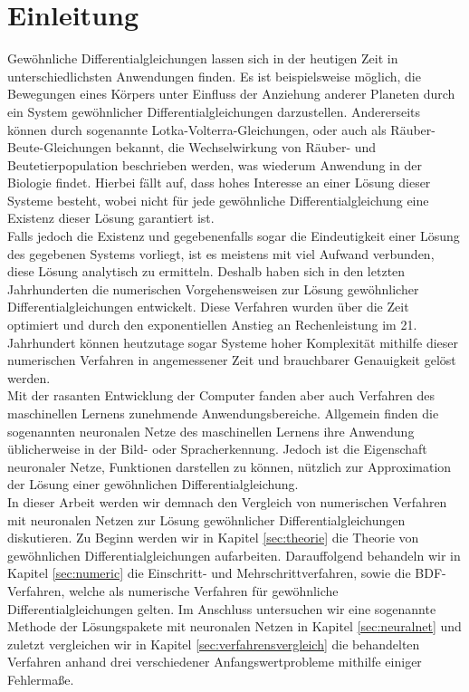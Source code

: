 \section{Einleitung}
\label{sec:einleitung}
Gewöhnliche Differentialgleichungen lassen sich in der heutigen Zeit in unterschiedlichsten Anwendungen finden.
Es ist beispielsweise möglich, die Bewegungen eines Körpers unter Einfluss der Anziehung anderer Planeten durch
ein System gewöhnlicher Differentialgleichungen darzustellen. Andererseits können durch sogenannte
Lotka-Volterra-Gleichungen, oder auch als Räuber-Beute-Gleichungen bekannt, die Wechselwirkung von Räuber- und
Beutetierpopulation beschrieben werden, was wiederum Anwendung in der Biologie findet. Hierbei fällt auf, dass hohes
Interesse an einer Lösung dieser Systeme besteht, wobei nicht für jede gewöhnliche Differentialgleichung eine Existenz
dieser Lösung garantiert ist.\\
Falls jedoch die Existenz und gegebenenfalls sogar die Eindeutigkeit einer Lösung des gegebenen Systems vorliegt, ist es
meistens mit viel Aufwand verbunden, diese Lösung analytisch zu ermitteln. Deshalb haben sich in den letzten
Jahrhunderten die numerischen Vorgehensweisen zur Lösung gewöhnlicher Differentialgleichungen entwickelt.
Diese Verfahren wurden über die Zeit optimiert und durch den exponentiellen Anstieg an Rechenleistung im 21. Jahrhundert
können heutzutage sogar Systeme hoher Komplexität mithilfe dieser numerischen Verfahren in angemessener Zeit und
brauchbarer Genauigkeit gelöst werden. \\
Mit der rasanten Entwicklung der Computer fanden aber auch Verfahren des maschinellen Lernens zunehmende
Anwendungsbereiche. Allgemein finden die sogenannten neuronalen Netze des maschinellen Lernens ihre Anwendung
üblicherweise in der Bild- oder Spracherkennung. Jedoch ist die Eigenschaft neuronaler Netze, Funktionen darstellen zu
können, nützlich zur Approximation der Lösung einer gewöhnlichen Differentialgleichung. \\
In dieser Arbeit werden wir demnach den Vergleich von numerischen Verfahren mit neuronalen Netzen zur Lösung
gewöhnlicher Differentialgleichungen diskutieren. Zu Beginn werden wir in Kapitel \ref{sec:theorie} die Theorie von
gewöhnlichen Differentialgleichungen aufarbeiten. Darauffolgend behandeln wir in Kapitel \ref{sec:numeric}
die Einschritt- und Mehrschrittverfahren, sowie die BDF-Verfahren, welche als numerische Verfahren für gewöhnliche
Differentialgleichungen gelten.
Im Anschluss untersuchen wir eine sogenannte Methode der Lösungspakete mit neuronalen Netzen in
Kapitel \ref{sec:neuralnet} und zuletzt vergleichen wir in Kapitel \ref{sec:verfahrensvergleich} die behandelten
Verfahren anhand drei verschiedener Anfangswertprobleme mithilfe einiger Fehlermaße.
\newpage

